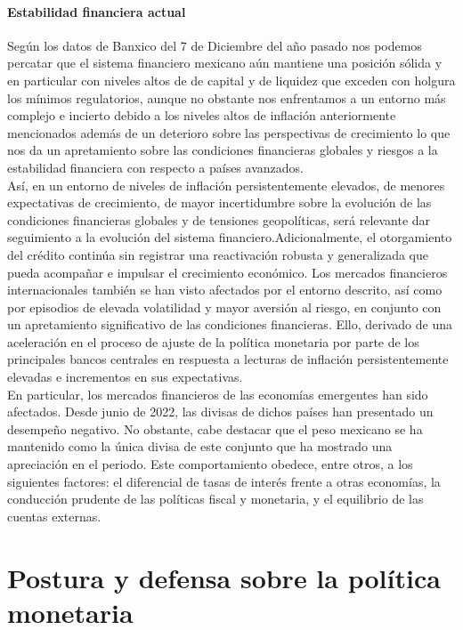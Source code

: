 \documentclass{article}
\theoremstyle{mytheoremstyle}
\theoremstyle{mytheoremstyle}
\theoremstyle{myproblemstyle}
\begin{document}
\paragraph{Estabilidad financiera actual}

Según los datos de Banxico del 7 de Diciembre del año pasado nos podemos percatar que el sistema financiero mexicano aún mantiene una posición sólida y en particular con niveles altos de de capital y de liquidez que exceden con holgura los mínimos regulatorios, aunque no obstante nos enfrentamos a un entorno más complejo e incierto debido a los niveles altos de inflación anteriormente mencionados además de un deterioro sobre las perspectivas de crecimiento lo que nos da un apretamiento sobre las condiciones financieras globales y riesgos a la estabilidad financiera con respecto a países avanzados.\\

Así, en un entorno de niveles de inflación persistentemente elevados, de menores expectativas de crecimiento, de mayor incertidumbre sobre la evolución de las condiciones financieras globales y de tensiones geopolíticas, será relevante dar seguimiento a la evolución del sistema financiero.Adicionalmente, el otorgamiento del crédito continúa sin registrar una reactivación robusta y generalizada que pueda acompañar e impulsar el crecimiento económico. Los mercados financieros internacionales también se han visto  afectados por el entorno descrito, así como por episodios de elevada volatilidad y mayor  aversión al riesgo, en conjunto con un apretamiento significativo de las condiciones financieras. Ello, derivado de una aceleración en el proceso de ajuste de la política monetaria por parte de los principales bancos centrales en respuesta a lecturas de inflación persistentemente elevadas e incrementos en sus expectativas.\\


En particular, los mercados financieros de las economías emergentes han sido afectados. Desde junio de 2022, las divisas de dichos países han presentado un desempeño negativo. No obstante, cabe destacar que el peso mexicano se ha mantenido como la única divisa de este conjunto que ha mostrado una apreciación en el periodo. Este comportamiento obedece, entre otros, a los siguientes factores: el diferencial de tasas de interés frente a otras economías, la conducción prudente de las políticas fiscal y monetaria, y el equilibrio de las cuentas externas.\\

\section{Postura y defensa sobre la política monetaria}
\end{document}
